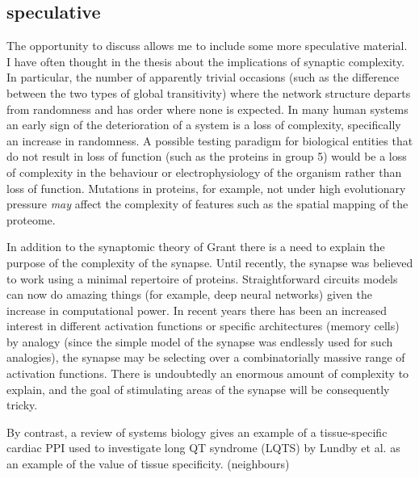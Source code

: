 \subsection{speculative}
The opportunity to discuss allows me to include some more speculative material. I have often thought in the thesis about the implications of synaptic complexity. In particular, the number of apparently trivial occasions (such as the difference between the two types of global transitivity) where the network structure departs from randomness and  has order where none is expected. In many human systems \cite{henriques2020nonlinear}\cite{robertson2015time}\cite{mullan2018habit} an early sign of the deterioration of a system is a loss of complexity, specifically an increase in randomness. A possible testing paradigm for biological entities that do not result in loss of function (such as the proteins in group 5) would be a loss of complexity in the behaviour or electrophysiology of the organism rather than loss of function. Mutations in proteins, for example, not under high evolutionary pressure \textit{may} affect the complexity of features such as the spatial mapping of the proteome\cite{grant2019synapse}. 

 In addition to the synaptomic theory of Grant there is a need to explain the purpose of the complexity of the synapse. Until recently, the synapse was believed to work using a minimal repertoire of proteins.  Straightforward circuits models can now do amazing things (for example, deep neural networks) given the increase in computational power. In recent years there has been an increased interest in different activation functions or specific architectures (memory cells) by analogy (since the simple model of the synapse was endlessly used for such analogies), the synapse may be selecting over a combinatorially massive range of activation functions. There is undoubtedly an enormous amount of complexity to explain, and the goal of stimulating areas of the synapse will be consequently tricky. 
 

By contrast, a review of systems biology \cite{parikshak2015systems} gives an example of a tissue-specific cardiac PPI used to investigate long QT syndrome (LQTS) by Lundby et al.\cite{lundby2014annotation} as an example of the value of tissue specificity. (neighbours)
